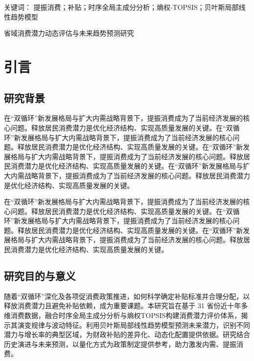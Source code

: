 \documentclass[UTF8,a4paper,zihao=-4,AutoFakeBold]{ctexart}
\newcommand{\fzxbsong}{\CJKfamily{fzxbsong}}
\begin{document}
		
		
		\heiti{}\setlength{\baselineskip}{24pt}  关键词：
		\songti{}\setlength{\baselineskip}{24pt} 提振消费；补贴；时序全局主成分分析；熵权-TOPSIS；贝叶斯局部线性趋势模型
	
	\clearpage
	\begin{center}
		\fzxbsong\setlength{\baselineskip}{24pt}
		省域消费潜力动态评估与未来趋势预测研究
	\end{center}
	\section{引言}
	\subsection{研究背景}
	在“双循环”新发展格局与扩大内需战略背景下，提振消费成为了当前经济发展的核心问题。释放居民消费潜力是优化经济结构、实现高质量发展的关键。在“双循环”新发展格局与扩大内需战略背景下，提振消费成为了当前经济发展的核心问题。释放居民消费潜力是优化经济结构、实现高质量发展的关键。在“双循环”新发展格局与扩大内需战略背景下，提振消费成为了当前经济发展的核心问题。释放居民消费潜力是优化经济结构、实现高质量发展的关键。在“双循环”新发展格局与扩大内需战略背景下，提振消费成为了当前经济发展的核心问题。释放居民消费潜力是优化经济结构、实现高质量发展的关键。
	
	在“双循环”新发展格局与扩大内需战略背景下，提振消费成为了当前经济发展的核心问题。释放居民消费潜力是优化经济结构、实现高质量发展的关键。在“双循环”新发展格局与扩大内需战略背景下，提振消费成为了当前经济发展的核心问题。释放居民消费潜力是优化经济结构、实现高质量发展的关键。在“双循环”新发展格局与扩大内需战略背景下，提振消费成为了当前经济发展的核心问题。释放居民消费潜力是优化经济结构、实现高质量发展的关键。
	
	\subsection{研究目的与意义}
	随着“双循环”深化及各项促消费政策推进，如何科学确定补贴标准并合理分配，以释放消费潜力且避免补贴依赖，成为重要课题。本研究旨在基于 31 省份近十年多维消费数据，融合时序全局主成分分析与熵权TOPSIS构建消费潜力评价体系，揭示其演变规律与波动特征。利用贝叶斯局部线性趋势模型预测未来潜力，识别不同潜力与增长率的典型区域，为财政补贴的差异化、动态化配置提供依据。研究结合历史演进与未来预测，以量化方式为政策制定提供参考，助力激发内需、提振消费。
\end{document}
